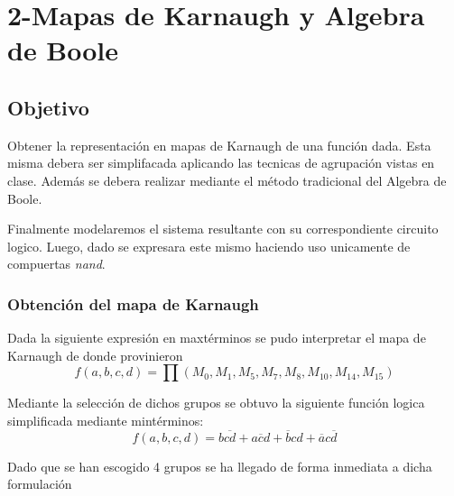 \chapter*{2-Mapas de Karnaugh y Algebra de Boole}
\section{Objetivo}
\indent\indent Obtener la representación en mapas de Karnaugh de una función dada. Esta misma debera ser simplifacada aplicando las tecnicas de agrupación vistas en clase. Además se debera realizar mediante el método tradicional del Algebra de Boole.

Finalmente modelaremos el sistema resultante con su correspondiente circuito logico. Luego, dado se expresara este mismo haciendo uso unicamente de compuertas \textit{nand}.

\subsection{Obtención del mapa de Karnaugh}
Dada la siguiente expresión en maxtérminos se pudo interpretar el mapa de Karnaugh de donde provinieron
\[
	f(a,b,c,d)=\prod\left(M_{0},M_{1},M_{5},M_{7},M_{8},M_{10},M_{14},M_{15}\right)
\]
\begin{center}
 \begin{Karnaugh}
    \end{Karnaugh}
\end{center}

Mediante la selección de dichos grupos se obtuvo la siguiente función logica simplificada mediante mintérminos:
\[
	f(a,b,c,d)= b\overline{cd} + a\overline{c}d +
				\overline{b}cd +\overline{a}c\overline{d}
\]

Dado que se han escogido 4 grupos se ha llegado de forma inmediata a dicha formulación

